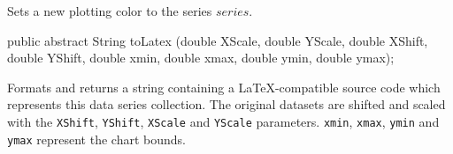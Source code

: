 \begin{tabb}
   Sets a new plotting color to the series $series$.
\end{tabb}
\begin{htmlonly}
\end{htmlonly}
\begin{code}

   public abstract String toLatex (double XScale, double YScale,
                                   double XShift, double YShift,
                                   double xmin, double xmax,
                                   double ymin, double ymax);
\end{code}
\begin{tabb}
   Formats and returns a string containing a \LaTeX-compatible source
   code which represents this data series collection. %
   The original datasets are shifted and scaled with the \texttt{XShift},
   \texttt{YShift}, \texttt{XScale} and \texttt{YScale} parameters.
   \texttt{xmin}, \texttt{xmax}, \texttt{ymin} and \texttt{ymax} represent the chart bounds.
\end{tabb}
\begin{htmlonly}
\end{htmlonly}
